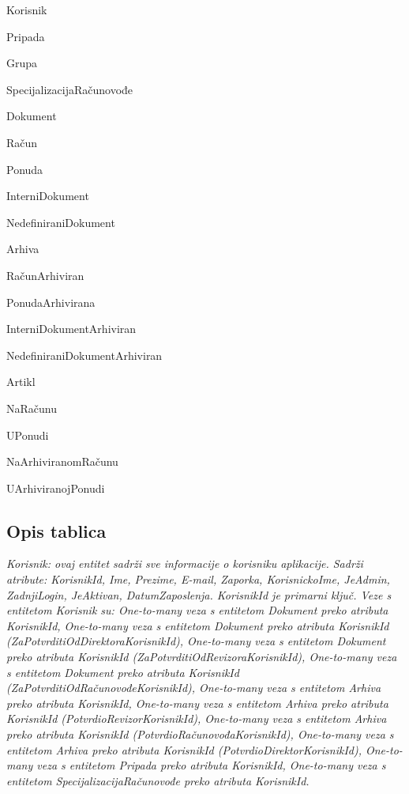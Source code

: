 		\begin{packed_item}
			\item  Korisnik
			\item  Pripada
			\item  Grupa
			\item  SpecijalizacijaRačunovođe
			\item  Dokument
			\item  Račun
			\item  Ponuda
			\item  InterniDokument
			\item  NedefiniraniDokument
			\item  Arhiva
			\item  RačunArhiviran
			\item  PonudaArhivirana
			\item  InterniDokumentArhiviran
			\item  NedefiniraniDokumentArhiviran
			\item  Artikl
			\item  NaRačunu
			\item  UPonudi
			\item  NaArhiviranomRačunu
			\item  UArhiviranojPonudi
		\end{packed_item}
		
			\subsection{Opis tablica}
			

				\textit{Korisnik: ovaj entitet sadrži sve informacije o korisniku aplikacije. Sadrži atribute: KorisnikId, Ime, Prezime, E-mail, Zaporka, KorisnickoIme, JeAdmin, ZadnjiLogin, JeAktivan, DatumZaposlenja. KorisnikId je primarni ključ.
				Veze s entitetom Korisnik su: One-to-many veza s entitetom Dokument preko atributa KorisnikId,
				One-to-many veza s entitetom Dokument preko atributa KorisnikId (ZaPotvrditiOdDirektoraKorisnikId),
				One-to-many veza s entitetom Dokument preko atributa KorisnikId (ZaPotvrditiOdRevizoraKorisnikId),
				One-to-many veza s entitetom Dokument preko atributa KorisnikId (ZaPotvrditiOdRačunovođeKorisnikId),
				One-to-many veza s entitetom Arhiva preko atributa KorisnikId,
				One-to-many veza s entitetom Arhiva preko atributa KorisnikId (PotvrdioRevizorKorisnikId),
				One-to-many veza s entitetom Arhiva preko atributa KorisnikId (PotvrdioRačunovođaKorisnikId),
				One-to-many veza s entitetom Arhiva preko atributa KorisnikId (PotvrdioDirektorKorisnikId),
				One-to-many veza s entitetom Pripada preko atributa KorisnikId,
				One-to-many veza s entitetom SpecijalizacijaRačunovođe preko atributa KorisnikId.}\\
				
